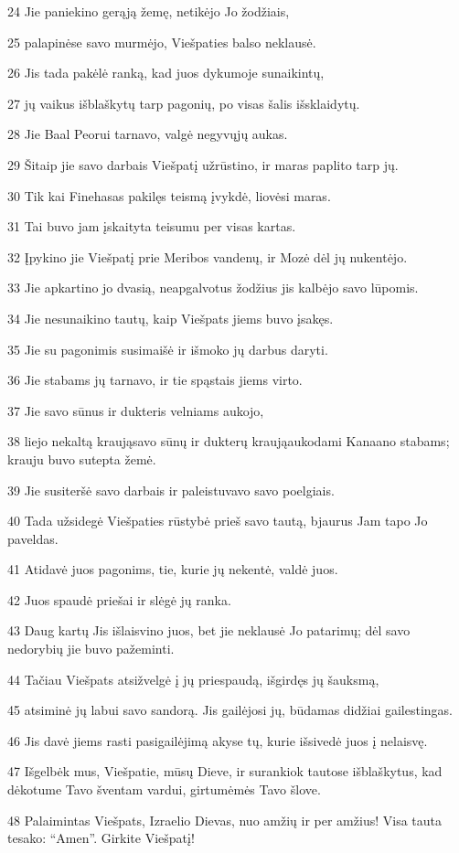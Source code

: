 \par 24 Jie paniekino gerąją žemę, netikėjo Jo žodžiais, 
\par 25 palapinėse savo murmėjo, Viešpaties balso neklausė. 
\par 26 Jis tada pakėlė ranką, kad juos dykumoje sunaikintų, 
\par 27 jų vaikus išblaškytų tarp pagonių, po visas šalis išsklaidytų. 
\par 28 Jie Baal Peorui tarnavo, valgė negyvųjų aukas. 
\par 29 Šitaip jie savo darbais Viešpatį užrūstino, ir maras paplito tarp jų. 
\par 30 Tik kai Finehasas pakilęs teismą įvykdė, liovėsi maras. 
\par 31 Tai buvo jam įskaityta teisumu per visas kartas. 
\par 32 Įpykino jie Viešpatį prie Meribos vandenų, ir Mozė dėl jų nukentėjo. 
\par 33 Jie apkartino jo dvasią, neapgalvotus žodžius jis kalbėjo savo lūpomis. 
\par 34 Jie nesunaikino tautų, kaip Viešpats jiems buvo įsakęs. 
\par 35 Jie su pagonimis susimaišė ir išmoko jų darbus daryti. 
\par 36 Jie stabams jų tarnavo, ir tie spąstais jiems virto. 
\par 37 Jie savo sūnus ir dukteris velniams aukojo, 
\par 38 liejo nekaltą kraują­savo sūnų ir dukterų kraują­aukodami Kanaano stabams; krauju buvo sutepta žemė. 
\par 39 Jie susiteršė savo darbais ir paleistuvavo savo poelgiais. 
\par 40 Tada užsidegė Viešpaties rūstybė prieš savo tautą, bjaurus Jam tapo Jo paveldas. 
\par 41 Atidavė juos pagonims, tie, kurie jų nekentė, valdė juos. 
\par 42 Juos spaudė priešai ir slėgė jų ranka. 
\par 43 Daug kartų Jis išlaisvino juos, bet jie neklausė Jo patarimų; dėl savo nedorybių jie buvo pažeminti. 
\par 44 Tačiau Viešpats atsižvelgė į jų priespaudą, išgirdęs jų šauksmą, 
\par 45 atsiminė jų labui savo sandorą. Jis gailėjosi jų, būdamas didžiai gailestingas. 
\par 46 Jis davė jiems rasti pasigailėjimą akyse tų, kurie išsivedė juos į nelaisvę. 
\par 47 Išgelbėk mus, Viešpatie, mūsų Dieve, ir surankiok tautose išblaškytus, kad dėkotume Tavo šventam vardui, girtumėmės Tavo šlove. 
\par 48 Palaimintas Viešpats, Izraelio Dievas, nuo amžių ir per amžius! Visa tauta tesako: “Amen”. Girkite Viešpatį!


